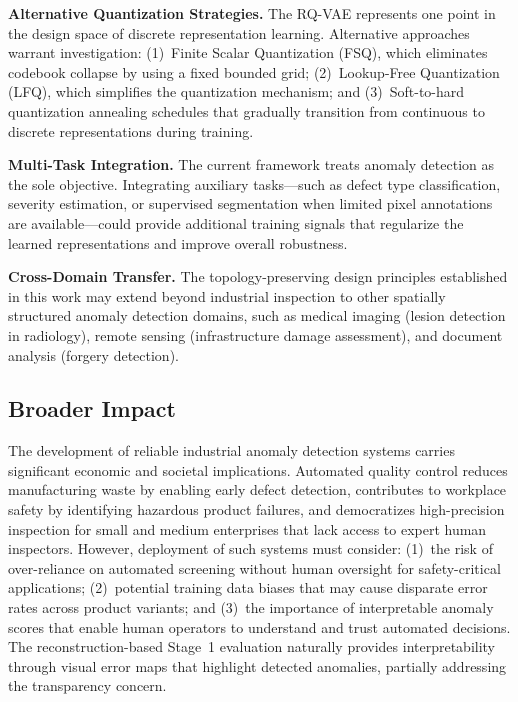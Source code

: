 \documentclass[lettersize,journal]{IEEEtran}
\begin{document}
\textbf{Alternative Quantization Strategies.} The RQ-VAE represents one point in the design space of discrete representation learning. Alternative approaches warrant investigation: (1)~Finite Scalar Quantization (FSQ), which eliminates codebook collapse by using a fixed bounded grid; (2)~Lookup-Free Quantization (LFQ), which simplifies the quantization mechanism; and (3)~Soft-to-hard quantization annealing schedules that gradually transition from continuous to discrete representations during training.

\textbf{Multi-Task Integration.} The current framework treats anomaly detection as the sole objective. Integrating auxiliary tasks---such as defect type classification, severity estimation, or supervised segmentation when limited pixel annotations are available---could provide additional training signals that regularize the learned representations and improve overall robustness.

\textbf{Cross-Domain Transfer.} The topology-preserving design principles established in this work may extend beyond industrial inspection to other spatially structured anomaly detection domains, such as medical imaging (lesion detection in radiology), remote sensing (infrastructure damage assessment), and document analysis (forgery detection).

\subsection{Broader Impact}

The development of reliable industrial anomaly detection systems carries significant economic and societal implications. Automated quality control reduces manufacturing waste by enabling early defect detection, contributes to workplace safety by identifying hazardous product failures, and democratizes high-precision inspection for small and medium enterprises that lack access to expert human inspectors. However, deployment of such systems must consider: (1)~the risk of over-reliance on automated screening without human oversight for safety-critical applications; (2)~potential training data biases that may cause disparate error rates across product variants; and (3)~the importance of interpretable anomaly scores that enable human operators to understand and trust automated decisions. The reconstruction-based Stage~1 evaluation naturally provides interpretability through visual error maps that highlight detected anomalies, partially addressing the transparency concern.
\end{document}
